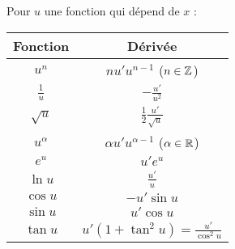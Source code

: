 \documentclass[10pt,class=article,crop=false]{standalone}
\begin{document}
\begin{multicols}{2}
\bigskip

Pour $u$ une fonction qui dépend de $x$ :
\begin{center}
    \setlength{\arrayrulewidth}{0.05mm}
	\begin{tabular}[t]{|c|c@{\vrule depth 1.2ex height 3ex width 0mm \ }|}
		\hline
		\textbf{Fonction}         & \textbf{Dérivée} \\ \hline
		$u^n$         & $nu'u^{n-1}$  \quad  ($n \in \mathbb{Z}$)   \\ \hline
		$\frac 1u$    & $-\frac{u'}{u^2}$              \\ \hline
		$\sqrt{u}$    & $\frac12 \frac{u'}{\sqrt{u}}$   \\ \hline
		$u^\alpha$   & $\alpha u' u^{\alpha-1}$ \quad ($\alpha\in\mathbb{R}$)  \\ \hline
		$e^u$         & $u'e^u$                        \\ \hline
		$\ln u$       & $\frac {u'}{u}$                   \\ \hline
		$\cos u$      & $-u'\sin u$                    \\ \hline
		$\sin u$      & $u'\cos u$                     \\ \hline
		$\tan u$      & $u'(1+\tan^2 u) = \frac{u'}{\cos^2 u}$        \\ \hline
	\end{tabular}
\end{center}


\end{multicols}
\end{document}
